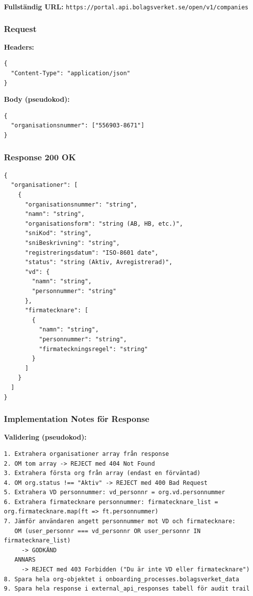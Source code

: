\documentclass[12pt,a4paper]{article}
\begin{document}
\textbf{Fullständig URL:} \texttt{https://portal.api.bolagsverket.se/open/v1/companies}

\subsubsection{Request}

\textbf{Headers:}
\begin{lstlisting}
{
  "Content-Type": "application/json"
}
\end{lstlisting}

\textbf{Body (pseudokod):}
\begin{lstlisting}
{
  "organisationsnummer": ["556903-8671"]
}
\end{lstlisting}

\subsubsection{Response 200 OK}
\begin{lstlisting}
{
  "organisationer": [
    {
      "organisationsnummer": "string",
      "namn": "string",
      "organisationsform": "string (AB, HB, etc.)",
      "sniKod": "string",
      "sniBeskrivning": "string",
      "registreringsdatum": "ISO-8601 date",
      "status": "string (Aktiv, Avregistrerad)",
      "vd": {
        "namn": "string",
        "personnummer": "string"
      },
      "firmatecknare": [
        {
          "namn": "string",
          "personnummer": "string",
          "firmateckningsregel": "string"
        }
      ]
    }
  ]
}
\end{lstlisting}

\subsubsection{Implementation Notes för Response}

\textbf{Validering (pseudokod):}
\begin{lstlisting}
1. Extrahera organisationer array från response
2. OM tom array -> REJECT med 404 Not Found
3. Extrahera första org från array (endast en förväntad)
4. OM org.status !== "Aktiv" -> REJECT med 400 Bad Request
5. Extrahera VD personnummer: vd_personnr = org.vd.personnummer
6. Extrahera firmatecknare personnummer: firmatecknare_list = org.firmatecknare.map(ft => ft.personnummer)
7. Jämför användaren angett personnummer mot VD och firmatecknare:
   OM (user_personnr === vd_personnr OR user_personnr IN firmatecknare_list)
     -> GODKÄND
   ANNARS
     -> REJECT med 403 Forbidden ("Du är inte VD eller firmatecknare")
8. Spara hela org-objektet i onboarding_processes.bolagsverket_data
9. Spara hela response i external_api_responses tabell för audit trail
\end{lstlisting}
\end{document}
